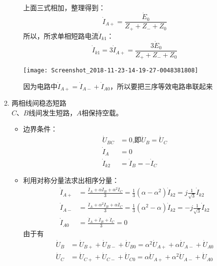 \documentclass[blue]{elegantnote}
\begin{document}
\begin{enumerate}
\begin{itemize}
\begin{displaymath}
\begin{aligned}
		\end{aligned}
		\end{displaymath}
		上面三式相加，整理得到：
		$$\dot{I}_{A+}=\frac{\dot{E}_{0}}{Z_{+}+Z_{-}+Z_{0}}$$
		所以，所求单相短路电流$\dot{I}_{k1}$：
		$$\dot{I}_{k1}=3\dot{I}_{A+}=\frac{3\dot{E}_{0}}{Z_{+}+Z_{-}+Z_{0}}$$
		\begin{center}
			\texttt{[image: Screenshot\_2018-11-23-14-19-27-0048381808]}
		\end{center}
		\begin{note}
			因为电路中$\dot{I}_{A+}=\dot{I}_{A-}+\dot{I}_{A0}$，所以要把三序等效电路串联起来
		\end{note}
		\end{itemize}
	
	\item 两相线间稳态短路\\
	$C\text{、}B$线间发生短路，$A$相保持空载。
	\begin{itemize}
		\item 边界条件：
		\begin{displaymath}
		\begin{aligned}
		\dot{U}_{BC}&=0\text{,即}\dot{U}_{B}=\dot{U}_{C}\\
		\dot{I}_A&=0\\
		\dot{I}_{k2}&=\dot{I}_{B}=-\dot{I}_C
		\end{aligned}
		\end{displaymath}
		\item 利用对称分量法求出相序分量：
		\begin{displaymath}
		\begin{aligned}
			\dot{I}_{A+}&=\frac{\dot{I}_{A}+\alpha \dot{I}_{B}+\alpha^{2}\dot{I}_{C}}{3}=\frac{1}{3}(\alpha-\alpha^{2})\dot{I}_{k2}=j\frac{1}{\sqrt{3}}\dot{I}_{k2}\\
			\dot{I}_{A-}&=\frac{\dot{I}_{A}+\alpha^{2} \dot{I}_{B}+\alpha\dot{I}_{C}}{3}=\frac{1}{3}(\alpha^{2}-\alpha)\dot{I}_{k2}=-j\frac{1}{\sqrt{3}}\dot{I}_{k2}\\
			\dot{I}_{A0}&=\frac{\dot{I}_{A}+ \dot{I}_{B}+\dot{I}_{C}}{3}=0
		\end{aligned}
		\end{displaymath}
	    由于有
	    \begin{displaymath}
	    \begin{aligned}
		    \dot{U}_{B}&=\dot{U}_{B+}+\dot{U}_{B-}+\dot{U}_{B0}=\alpha^{2}\dot{U}_{A+}+\alpha\dot{U}_{A-}+\dot{U}_{A0}\\
		    \dot{U}_{C}&=\dot{U}_{C+}+\dot{U}_{C-}+\dot{U}_{C0}=\alpha\dot{U}_{A+}+\alpha^{2}\dot{U}_{A-}+\dot{U}_{A0}\\

\end{aligned}
\end{displaymath}
\end{itemize}
\end{enumerate}
\end{document}
